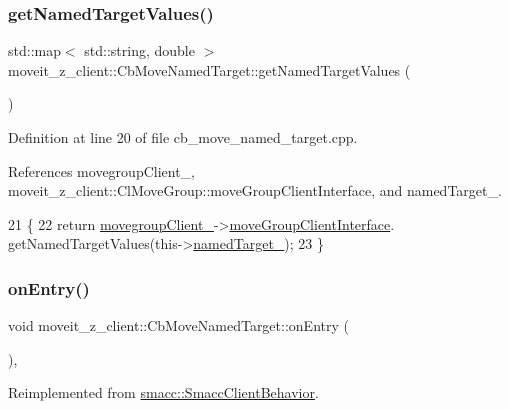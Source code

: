 \subsubsection{\texorpdfstring{get\+Named\+Target\+Values()}{getNamedTargetValues()}}
{\footnotesize\ttfamily std\+::map$<$ std\+::string, double $>$ moveit\+\_\+z\+\_\+client\+::\+Cb\+Move\+Named\+Target\+::get\+Named\+Target\+Values (\begin{DoxyParamCaption}{ }\end{DoxyParamCaption})}



Definition at line 20 of file cb\+\_\+move\+\_\+named\+\_\+target.\+cpp.



References movegroup\+Client\+\_\+, moveit\+\_\+z\+\_\+client\+::\+Cl\+Move\+Group\+::move\+Group\+Client\+Interface, and named\+Target\+\_\+.


\begin{DoxyCode}
21 \{
22     \textcolor{keywordflow}{return} \hyperlink{classmoveit__z__client_1_1CbMoveNamedTarget_a1caf87b542890eb9181b04dc2271ef65}{movegroupClient\_}->\hyperlink{classmoveit__z__client_1_1ClMoveGroup_af86e046b837be0ef4afa9893d8808f20}{moveGroupClientInterface}.
      getNamedTargetValues(this->\hyperlink{classmoveit__z__client_1_1CbMoveNamedTarget_a84a8aadc460b4a68eae22d25479c2bce}{namedTarget\_});
23 \}
\end{DoxyCode}
\mbox{\label{classmoveit__z__client_1_1CbMoveNamedTarget_ad84bcf4ea514c0cdc3550ca41ff77d69}} 
\subsubsection{\texorpdfstring{on\+Entry()}{onEntry()}}
{\footnotesize\ttfamily void moveit\+\_\+z\+\_\+client\+::\+Cb\+Move\+Named\+Target\+::on\+Entry (\begin{DoxyParamCaption}{ }\end{DoxyParamCaption})\hspace{0.3cm}{\ttfamily [override]}, {\ttfamily [virtual]}}



Reimplemented from \hyperlink{classsmacc_1_1SmaccClientBehavior_ad5d3e1f1697c3cfe66c94cadba948493}{smacc\+::\+Smacc\+Client\+Behavior}.



